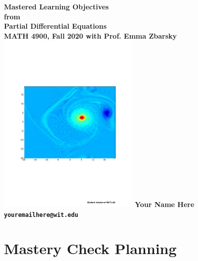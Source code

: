 \documentclass{article}
\newtheorem{theorem}{Theorem}[section]
\begin{document}
\begin{titlepage}
  \begin{center}
    \bfseries
\huge Mastered Learning Objectives \\  from \\ Partial Differential Equations \\[.5in]
\large MATH 4900, Fall 2020 with Prof. Emma Zbarsky
\vfill
\includegraphics[height=3.5in, angle=90]{coolimage}
\vfill
\LARGE Your Name Here \\[.2in]
\texttt{youremailhere@wit.edu}
\end{center}      
\end{titlepage}
\newpage
\tableofcontents
\newpage


\section{Mastery Check Planning}
\end{document}
